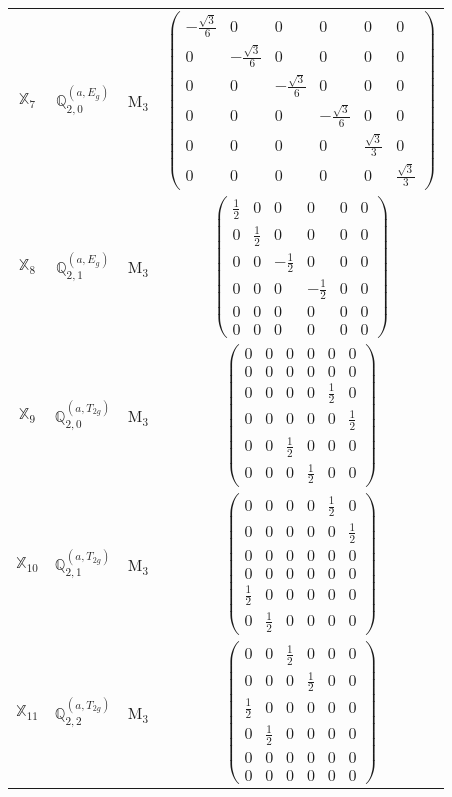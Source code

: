 \documentclass[fleqn,10pt,landscape]{article}
\begin{document}
\begin{itemize}
\begin{center}
\begin{longtable}{c|c|c|c}
$ \mathbb{X}_{7} $ & $\mathbb{Q}_{2,0}^{(a,E_{g})}$ & M$_{3}$ & $\begin{pmatrix} - \frac{\sqrt{3}}{6} & 0 & 0 & 0 & 0 & 0 \\ 0 & - \frac{\sqrt{3}}{6} & 0 & 0 & 0 & 0 \\ 0 & 0 & - \frac{\sqrt{3}}{6} & 0 & 0 & 0 \\ 0 & 0 & 0 & - \frac{\sqrt{3}}{6} & 0 & 0 \\ 0 & 0 & 0 & 0 & \frac{\sqrt{3}}{3} & 0 \\ 0 & 0 & 0 & 0 & 0 & \frac{\sqrt{3}}{3} \end{pmatrix}$ \\
$ \mathbb{X}_{8} $ & $\mathbb{Q}_{2,1}^{(a,E_{g})}$ & M$_{3}$ & $\begin{pmatrix} \frac{1}{2} & 0 & 0 & 0 & 0 & 0 \\ 0 & \frac{1}{2} & 0 & 0 & 0 & 0 \\ 0 & 0 & - \frac{1}{2} & 0 & 0 & 0 \\ 0 & 0 & 0 & - \frac{1}{2} & 0 & 0 \\ 0 & 0 & 0 & 0 & 0 & 0 \\ 0 & 0 & 0 & 0 & 0 & 0 \end{pmatrix}$ \\
$ \mathbb{X}_{9} $ & $\mathbb{Q}_{2,0}^{(a,T_{2g})}$ & M$_{3}$ & $\begin{pmatrix} 0 & 0 & 0 & 0 & 0 & 0 \\ 0 & 0 & 0 & 0 & 0 & 0 \\ 0 & 0 & 0 & 0 & \frac{1}{2} & 0 \\ 0 & 0 & 0 & 0 & 0 & \frac{1}{2} \\ 0 & 0 & \frac{1}{2} & 0 & 0 & 0 \\ 0 & 0 & 0 & \frac{1}{2} & 0 & 0 \end{pmatrix}$ \\
$ \mathbb{X}_{10} $ & $\mathbb{Q}_{2,1}^{(a,T_{2g})}$ & M$_{3}$ & $\begin{pmatrix} 0 & 0 & 0 & 0 & \frac{1}{2} & 0 \\ 0 & 0 & 0 & 0 & 0 & \frac{1}{2} \\ 0 & 0 & 0 & 0 & 0 & 0 \\ 0 & 0 & 0 & 0 & 0 & 0 \\ \frac{1}{2} & 0 & 0 & 0 & 0 & 0 \\ 0 & \frac{1}{2} & 0 & 0 & 0 & 0 \end{pmatrix}$ \\
$ \mathbb{X}_{11} $ & $\mathbb{Q}_{2,2}^{(a,T_{2g})}$ & M$_{3}$ & $\begin{pmatrix} 0 & 0 & \frac{1}{2} & 0 & 0 & 0 \\ 0 & 0 & 0 & \frac{1}{2} & 0 & 0 \\ \frac{1}{2} & 0 & 0 & 0 & 0 & 0 \\ 0 & \frac{1}{2} & 0 & 0 & 0 & 0 \\ 0 & 0 & 0 & 0 & 0 & 0 \\ 0 & 0 & 0 & 0 & 0 & 0 \end{pmatrix}$ \\

\end{longtable}
\end{center}
\end{itemize}
\end{document}
